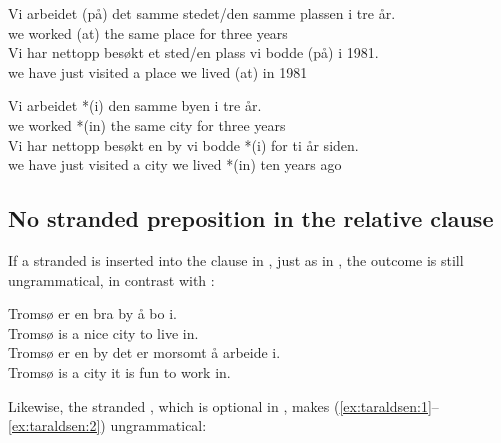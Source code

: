 \documentclass[output=paper]{LSP/langsci}
\begin{document}
\ea%
\label{ex:taraldsen:11}
\ea \gll Vi arbeidet (på) {det samme stedet/den samme plassen} i tre år.\\
         we worked (at)  {the same place}           for three years\\
\ex \label{ex:taraldsen:11b} \gll Vi har nettopp besøkt {et sted/en plass} vi bodde (på) i 1981.\\
         we have just    visited {a  place}             we lived (at)  in 1981\\
\z\z

\ea
\label{ex:taraldsen:12}
\ea \gll Vi arbeidet *(i) den samme byen  i tre år.\\
         we worked *(in) the same city     for three years\\
\ex\label{ex:taraldsen:12b} \gll Vi har nettopp besøkt en by vi bodde *(i) for ti år siden.\\
	 we have just    visited a  city we lived *(in) {}  ten years ago\\
\z\z

\subsection{No stranded preposition in the relative clause}\label{sec:taraldsen:2.4}

If a stranded  is inserted into the  clause in , just as in , the outcome is still ungrammatical, in contrast with :

\ea%
\label{ex:taraldsen:13}
\z\z

\ea%
    \label{ex:taraldsen:14}
    \ea \gll Tromsø er en bra by å bo i.\\
	     Tromsø is a nice city to live in.\\
    \ex \gll Tromsø er en by det er morsomt å arbeide i.\\
	     Tromsø is a city it is fun to work in.\\
	 \z
\z

Likewise, the stranded , which is optional in , makes (\ref{ex:taraldsen:1}--\ref{ex:taraldsen:2}) ungrammatical:
\end{document}

